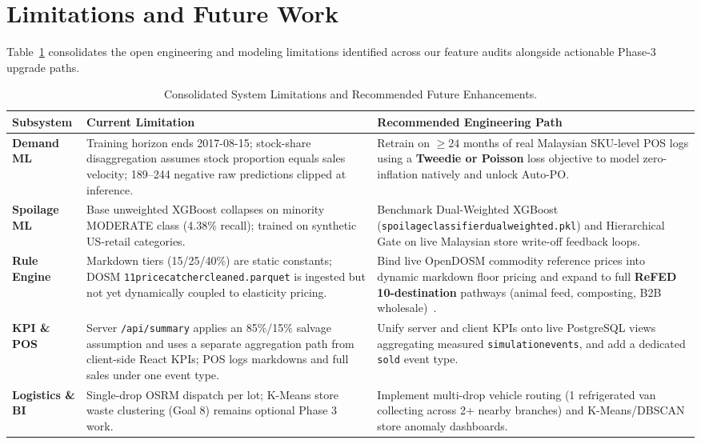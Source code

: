 \documentclass[11pt,a4paper]{article}
\renewcommand{\_}{\oldunderscore\allowbreak}
\begin{document}
\section{Limitations and Future Work}

Table~\ref{tab:limitations} consolidates the open engineering and modeling limitations identified across our feature audits alongside actionable Phase-3 upgrade paths.

\begin{table}[H]
\centering
\caption{Consolidated System Limitations and Recommended Future Enhancements.}
\label{tab:limitations}
\renewcommand{\arraystretch}{1.15}
{\scriptsize
\begin{tabularx}{\textwidth}{@{} >{\bfseries}l >{\raggedright\arraybackslash}X >{\raggedright\arraybackslash}X @{}}
\toprule
\rowcolor{NavyPrimary}
\color{white}\textbf{Subsystem} & \color{white}\textbf{Current Limitation} & \color{white}\textbf{Recommended Engineering Path} \\
\midrule
Demand ML & Training horizon ends 2017-08-15; stock-share disaggregation assumes stock proportion equals sales velocity; 189--244 negative raw predictions clipped at inference. & Retrain on $\ge 24$ months of real Malaysian SKU-level POS logs using a \textbf{Tweedie or Poisson} loss objective to model zero-inflation natively and unlock Auto-PO. \\
\rowcolor{LightBg}
Spoilage ML & Base unweighted XGBoost collapses on minority MODERATE class (4.38\% recall); trained on synthetic US-retail categories. & Benchmark Dual-Weighted XGBoost (\texttt{spoilage\_classifier\_dual\_weighted.pkl}) and Hierarchical Gate on live Malaysian store write-off feedback loops. \\
Rule Engine & Markdown tiers (15/25/40\%) are static constants; DOSM \texttt{11\_pricecatcher\_cleaned.parquet} is ingested but not yet dynamically coupled to elasticity pricing. & Bind live OpenDOSM commodity reference prices into dynamic markdown floor pricing and expand to full \textbf{ReFED 10-destination} pathways (animal feed, composting, B2B wholesale)~\cite{refed2026}. \\
\rowcolor{LightBg}
KPI \& POS & Server \texttt{/api/summary} applies an 85\%/15\% salvage assumption and uses a separate aggregation path from client-side React KPIs; POS logs markdowns and full sales under one event type. & Unify server and client KPIs onto live PostgreSQL views aggregating measured \texttt{simulation\_events}, and add a dedicated \texttt{sold} event type. \\
Logistics \& BI & Single-drop OSRM dispatch per lot; K-Means store waste clustering (Goal 8) remains optional Phase 3 work. & Implement multi-drop vehicle routing (1 refrigerated van collecting across 2+ nearby branches) and K-Means/DBSCAN store anomaly dashboards. \\
\bottomrule
\end{tabularx}}
\end{table}
\end{document}
